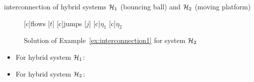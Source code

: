 \begin{example}{interconnection of hybrid systems $\mathcal{H}_1$ (bouncing ball) and $\mathcal{H}_2$ (moving platform)}
\begin{figure}[ht]
  \centering
  [c]{flows [$t$]}
  [c]{jumps [$j$]}
  [c]{$\eta_1$}
  [c]{$\eta_2$}
\qquad
{}
\caption{Solution of Example~\ref{ex:interconnection1} for system $\mathcal{H}_2$}
\end{figure}


\begin{itemize}
\item For hybrid system $\mathcal{H}_1$:






\item For hybrid system $\mathcal{H}_2$:


\end{itemize}
\end{example}
